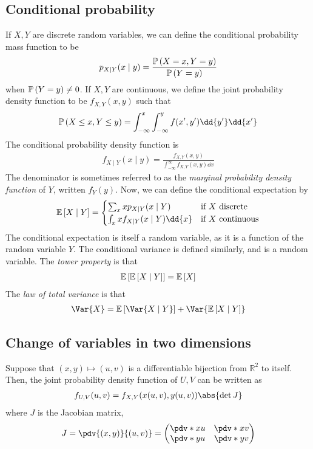 \subsection{Conditional probability}
If $X, Y$ are discrete random variables, we can define the conditional probability mass function to be
\begin{align*}
	p_{X \mid Y}(x \mid y) = \frac{\mathbb{P}\left({X = x, Y = y}\right)}{\mathbb{P}\left({Y = y}\right)}
\end{align*}
when $\mathbb{P}\left({Y = y}\right) \neq 0$.
If $X, Y$ are continuous, we define the joint probability density function to be $f_{X, Y}(x,y)$ such that
\begin{align*}
	\prob{X \leq x, Y \leq y} = \int_{-\infty}^x \int_{-\infty}^y f(x',y') \dd{y'}\dd{x'}
\end{align*}
The conditional probability density function is
\begin{align*}
	f_{X \mid Y}(x \mid y) = \frac{f_{X, Y}(x,y)}{\int_{-\infty}^\infty f_{X,Y}(x,y) \dd{x}}
\end{align*}
The denominator is sometimes referred to as the \textit{marginal probability density function} of $Y$, written $f_Y(y)$.
Now, we can define the conditional expectation by
\begin{align*}
	\expect{X \mid Y} = \begin{cases}
		\sum_x x p_{X \mid Y}(x \mid Y)        & \text{if } X \text{ discrete}   \\
		\int_x x f_{X \mid Y}(x \mid Y) \dd{x} & \text{if } X \text{ continuous}
	\end{cases}
\end{align*}
The conditional expectation is itself a random variable, as it is a function of the random variable $Y$.
The conditional variance is defined similarly, and is a random variable.
The \textit{tower property} is that
\begin{align*}
	\mathbb{E}\left[{\mathbb{E}\left[{X \mid Y}\right]}\right] = \mathbb{E}\left[{X}\right]
\end{align*}
The \textit{law of total variance} is that
\begin{align*}
	\Var{X} = \expect{\Var{X \mid Y}} + \Var{\expect{X \mid Y}}
\end{align*}

\subsection{Change of variables in two dimensions}
Suppose that $(x, y) \mapsto (u,v)$ is a differentiable bijection from $\mathbb R^2$ to itself.
Then, the joint probability density function of $U,V$ can be written as
\begin{align*}
	f_{U,V}(u,v) = f_{X,Y}(x(u,v), y(u,v)) \abs{\det J}
\end{align*}
where $J$ is the Jacobian matrix,
\begin{align*}
	J = \pdv{(x,y)}{(u,v)} = \begin{pmatrix}
		\pdv*{x}{u} & \pdv*{x}{v} \\
		\pdv*{y}{u} & \pdv*{y}{v}
	\end{pmatrix}
\end{align*}

